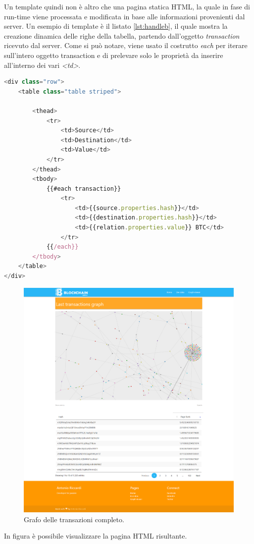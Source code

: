 \begin{itemize}
Un template quindi non è altro che una pagina statica HTML, la quale in fase di run-time viene processata e modificata in base alle informazioni provenienti dal server. Un esempio di template è il listato \ref{lst:handleb}, il quale mostra la creazione dinamica delle righe della tabella, partendo dall'oggetto \textit{transaction} ricevuto dal server. Come si può notare, viene usato il costrutto \textit{each} per iterare sull'intero oggetto transaction e di prelevare solo le proprietà da inserire all'interno dei vari \textit{<td>}.

\begin{lstlisting}[language=Javascript, label=lst:handleb, caption={Template Handlebars.}]
<div class="row">
    <table class="table striped">

        <thead>
            <tr>
                <td>Source</td>
                <td>Destination</td>
                <td>Value</td>
            </tr>
        </thead>
        <tbody>
            {{#each transaction}}
                <tr>
                    <td>{{source.properties.hash}}</td>
                    <td>{{destination.properties.hash}}</td>
                    <td>{{relation.properties.value}} BTC</td>
                </tr>
            {{/each}}
        </tbody>
    </table>
</div>
\end{lstlisting}


\begin{figure}[H]
	\centering
	\includegraphics[width=\textwidth,  height=0.60\textheight]{images/graphView.png}
	\caption{Grafo delle transazioni completo.}
	\label{fig:graphView}
\end{figure}
In figura è possibile visualizzare la pagina HTML risultante. 

\end{itemize}